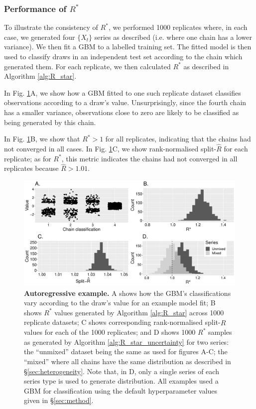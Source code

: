 \documentclass[ba]{imsart}
\numberwithin{equation}{section}
\theoremstyle{plain}
\begin{document}
\subsubsection{Performance of $R^*$}\label{sec:heterogeneity_performance}
To illustrate the consistency of $R^*$, we performed 1000 replicates where, in each case, we generated four $\{X_t\}$ series as described (i.e. where one chain has a lower variance). We then fit a GBM to a labelled training set. The fitted model is then used to classify draws in an independent test set according to the chain which generated them. For each replicate, we then calculated $R^*$ as described in Algorithm \ref{alg:R_star}.

In Fig. \ref{fig:ar1}A, we show how a GBM fitted to one such replicate dataset classifies observations according to a draw's value. Unsurprisingly, since the fourth chain has a smaller variance, observations close to zero are likely to be classified as being generated by this chain.

In Fig. \ref{fig:ar1}B, we show that $R^*>1$ for all replicates, indicating that the chains had not converged in all cases. In Fig. \ref{fig:ar1}C, we show rank-normalised split-$\widehat{R}$ for each replicate;  as for $R^*$, this metric indicates the chains had not converged in all replicates because $\widehat{R}>1.01$.

\begin{figure}[!htb]
	\centerline{\includegraphics[width=1.0\textwidth]{ar1.pdf}}
	\caption{\textbf{Autoregressive example.} A shows how the GBM's classifications vary according to the draw's value for an example model fit; B shows $R^*$ values generated by Algorithm \ref{alg:R_star} across 1000 replicate datasets; C shows corresponding rank-normalised split-$\widehat{R}$ values for each of the 1000 replicates; and D shows 1000 $R^*$ samples as generated by Algorithm \ref{alg:R_star_uncertainty} for two series: the ``unmixed'' dataset being the same as used for figures A-C; the ``mixed'' where all chains have the same distribution as described in \S\ref{sec:heterogeneity}. Note that, in D, only a single series of each series type is used to generate distribution. All examples used a GBM for classification using the default hyperparameter values given in \S\ref{sec:method}.}
	\label{fig:ar1}
\end{figure}
\end{document}
